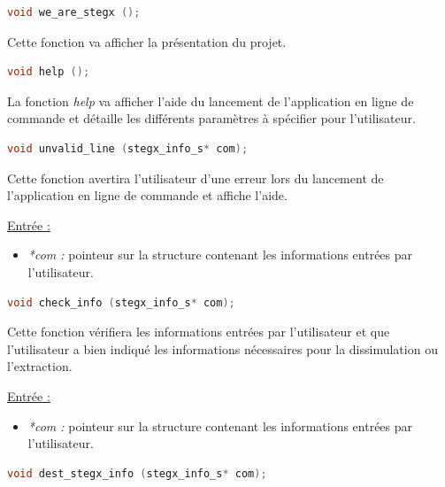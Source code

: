 \documentclass[11pt]{article}
\begin{document}
\begin{lstlisting}[language=c]
void we_are_stegx ();
\end{lstlisting}

Cette fonction va afficher la présentation du projet. \newline

\begin{lstlisting}[language=c]
void help ();
\end{lstlisting}

La fonction \textit{help} va afficher l'aide du lancement de l'application 
en ligne de commande et détaille les différents paramètres à spécifier 
pour l'utilisateur. \newline

\begin{lstlisting}[language=c]
void unvalid_line (stegx_info_s* com);
\end{lstlisting}

Cette fonction avertira l'utilisateur d'une erreur lors du lancement 
de l'application en ligne de commande et affiche l'aide. \newline

\underline{Entrée :} 
\begin{itemize}
\item \textit{*com :} pointeur sur la structure contenant les informations 
entrées par l'utilisateur. 
\newline 
\end{itemize}

\begin{lstlisting}[language=c]
void check_info (stegx_info_s* com);
\end{lstlisting}

Cette fonction vérifiera les informations entrées par l'utilisateur et 
que l'utilisateur a bien indiqué les informations nécessaires pour 
la dissimulation ou l'extraction. \newline

\underline{Entrée :} 
\begin{itemize}
\item \textit{*com :} pointeur sur la structure contenant les informations 
entrées par l'utilisateur. 
\newline 
\end{itemize}

\begin{lstlisting}[language=c]
void dest_stegx_info (stegx_info_s* com);
\end{lstlisting}
\end{document}
